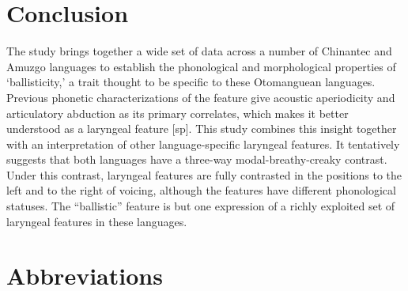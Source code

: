 \documentclass[output=paper]{langscibook}
\begin{document}
\section{Conclusion}\label{sec:dobui:5}

The study brings together a wide set of data across a number of Chinantec and Amuzgo languages to establish the phonological and morphological properties of ‘ballisticity,’ a trait thought to be specific to these Otomanguean languages. Previous phonetic characterizations of the feature give acoustic aperiodicity and articulatory abduction as its primary correlates, which makes it better understood as a laryngeal feature [sp]. This study combines this insight together with an interpretation of other language-specific laryngeal features. It tentatively suggests that both languages have a three-way modal-breathy-creaky contrast. Under this contrast, laryngeal features are fully contrasted in the positions to the left and to the right of voicing, although the features have different phonological statuses. The ``ballistic'' feature is but one expression of a richly exploited set of laryngeal features in these languages.

\section{Abbreviations}
\end{document}
